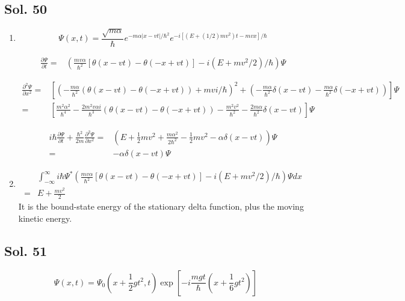 \subsection*{Sol. 50}
\begin{enumerate}
    \item 
    $$
    \Psi(x,t)=
    \frac{\sqrt{m\alpha}}{\hbar}
    e^{-m\alpha|x-vt|/\hbar^2}
    e^{-i[(E+(1/2)mv^2)t-mvx]/\hbar}
    $$

    \begin{align*}
        \frac{\partial\Psi}{\partial t}
    =& \left(\frac{mv\alpha}{\hbar^2}
    [\theta(x-vt)-\theta(-x+vt)]
    -i(E+mv^2/2)/\hbar\right)\Psi
    \end{align*}

    \begin{align*}
        \frac{\partial^2\Psi}{\partial x^2}
    =&
    \left[(-\frac{m\alpha}{\hbar^2}
    (\theta(x-vt)-\theta(-x+vt))
    +mvi/\hbar)^2+
    (
    -\frac{m\alpha}{\hbar^2}\delta(x-vt)
    -\frac{m\alpha}{\hbar^2}\delta(-x+vt)
    )\right]
    \Psi\\
    =& 
    \left[\frac{m^2\alpha^2}{\hbar^4}
    -\frac{2m^2v\alpha i}{\hbar^3}(\theta(x-vt)-\theta(-x+vt))
    -\frac{m^2v^2}{\hbar^2}
    -\frac{2m\alpha}{\hbar^2}\delta(x-vt)
    \right] 
    \Psi
    \end{align*}

    \begin{align*}
        i\hbar\frac{\partial\Psi}{\partial t}
        +
        \frac{\hbar^2}{2m}\frac{\partial^2\Psi}{\partial x^2}
        =& 
        (E+\frac{1}{2}mv^2
        +
        \frac{m\alpha^2}{2\hbar^2}
        -\frac{1}{2}mv^2
        -\alpha\delta(x-vt)
        )\Psi\\
        =& -\alpha\delta(x-vt)\Psi
    \end{align*}
\item 
\begin{align*}
    & \int_{-\infty}^{\infty}
    i\hbar 
    \Psi^*
    \left(\frac{mv\alpha}{\hbar^2}
    [\theta(x-vt)-\theta(-x+vt)]
    -i(E+mv^2/2)/\hbar\right)\Psi dx\\
    = &  
    E+\frac{mv^2}{2}
\end{align*}
It is the bound-state energy of the stationary delta function, plus the moving kinetic energy.
\end{enumerate}


\subsection*{Sol. 51}
$$
\Psi(x,t)=\Psi_0(x+\frac{1}{2}gt^2,t)
\exp\left[-i\frac{mgt}{\hbar}\left(x+\frac{1}{6}gt^2\right)\right]
$$

